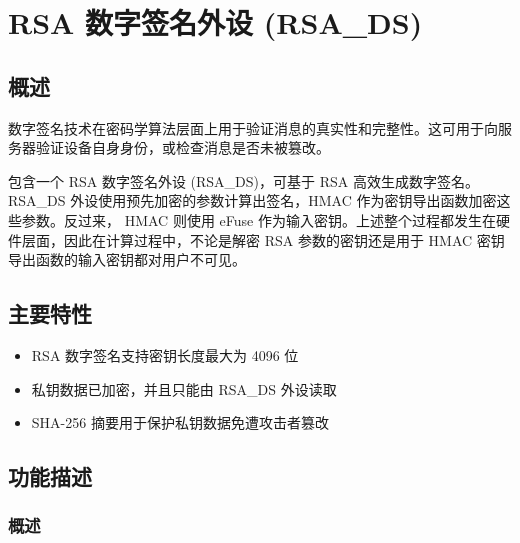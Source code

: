 \documentclass[main\_\_CN.tex]{subfiles}
\begin{document}

\ifglobal
\else
    {\let\clearpage\relax \listoftodos}
    \tableofcontents
\fi



\hypertarget{digsig}{}\hypertarget{rsads}{}
\chapter{RSA 数字签名外设 (RSA\_DS)}
\label{mod:digsig}


\section{概述}

数字签名技术在密码学算法层面上用于验证消息的真实性和完整性。这可用于向服务器验证设备自身身份，或检查消息是否未被篡改。

\chipname{} 包含一个 RSA 数字签名外设 (RSA\_DS)，可基于 RSA 高效生成数字签名。RSA\_DS 外设使用预先加密的参数计算出签名，HMAC 作为密钥导出函数加密这些参数。反过来， HMAC 则使用 eFuse 作为输入密钥。上述整个过程都发生在硬件层面，因此在计算过程中，不论是解密 RSA 参数的密钥还是用于 HMAC 密钥导出函数的输入密钥都对用户不可见。

\section{主要特性}

\begin{itemize}
\item RSA 数字签名支持密钥长度最大为 4096 位
\item 私钥数据已加密，并且只能由 RSA\_DS 外设读取
\item SHA-256 摘要用于保护私钥数据免遭攻击者篡改
\end{itemize}


\section{功能描述}
\subsection{概述}
\end{document}
